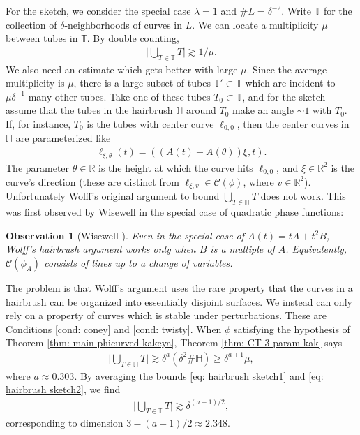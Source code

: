 \documentclass[12pt]{amsart}
\numberwithin{equation}{section}
\newtheorem{observation}{Observation}
\newcommand{\R}{\mathbb{R}}
\newcommand{\1}{\mathbbm{1}}
\begin{document}
For the sketch, we consider the special case $\lambda = 1$ and $\# L = \delta^{-2}$. Write $\mathbb T$ for the collection of $\delta$-neighborhoods of curves in $L$. We can locate a multiplicity $\mu$ between tubes in $\mathbb T$. By double counting, 
\begin{align}\label{eq: hairbrush sketch1}
    \Big |\bigcup_{T \in \mathbb T} T\Big | \gtrsim 1/\mu. 
\end{align}
We also need an estimate which gets better with large $\mu$. Since the average multiplicity is $\mu$, there is a large subset of tubes $\mathbb T' \subset \mathbb T$ which are incident to $\mu \delta^{-1}$ many other tubes. Take one of these tubes $T_0 \subset \mathbb T$, and for the sketch assume that the tubes in the hairbrush $\mathbb H$ around $T_0$ make an angle $\sim 1$ with $T_0$. If, for instance, $T_0$ is the tubes with center curve $\ell_{0,0}$, then the center curves in $\mathbb H$ are parameterized like 
\begin{align}\label{eq: intro: hairbrush param}
    \ell_{\xi, \theta}(t) = ((A(t) - A(\theta))\xi, t).
\end{align}
The parameter $\theta \in \R$ is the height at which the curve hits $\ell_{0,0}$, and $\xi \in \R^2$ is the curve's direction (these are distinct from $\ell_{\xi,v} \in \mathcal C(\phi)$, where $v \in \R^2$). Unfortunately Wolff's original argument to bound $\bigcup_{T \in \mathbb H} T$ does not work. This was first observed by Wisewell in the special case of quadratic phase functions: 
\begin{observation}[Wisewell ]
    Even in the special case of $A(t) = tA + t^2 B$, Wolff's hairbrush argument works only when $B$ is a multiple of $A$. Equivalently, $\mathcal C(\phi_A)$ consists of lines up to a change of variables. 
\end{observation}
The problem is that Wolff's argument uses the rare property that the curves in a hairbrush can be organized into essentially disjoint surfaces. We instead can only rely on a property of curves which is stable under perturbations. These are Conditions \ref{cond: coney} and \ref{cond: twisty}. When $\phi$ satisfying the hypothesis of Theorem \ref{thm: main phicurved kakeya}, Theorem \ref{thm: CT 3 param kak} says 
\begin{align}\label{eq: hairbrush sketch2}
    \Big |\bigcup_{T \in \mathbb H} T \Big | \gtrsim \delta^a ( \delta^2 \# \mathbb H) \geq \delta^{a + 1} \mu, 
\end{align}
where $a \approx 0.303$.
By averaging the bounds \eqref{eq: hairbrush sketch1} and \eqref{eq: hairbrush sketch2}, we find 
\begin{align}
    \Big |\bigcup_{T \in \mathbb T} T\Big | \gtrsim \delta^{(a + 1)/2},
\end{align}
corresponding to dimension $3 - (a + 1)/2 \approx 2.348$. 
\end{document}
